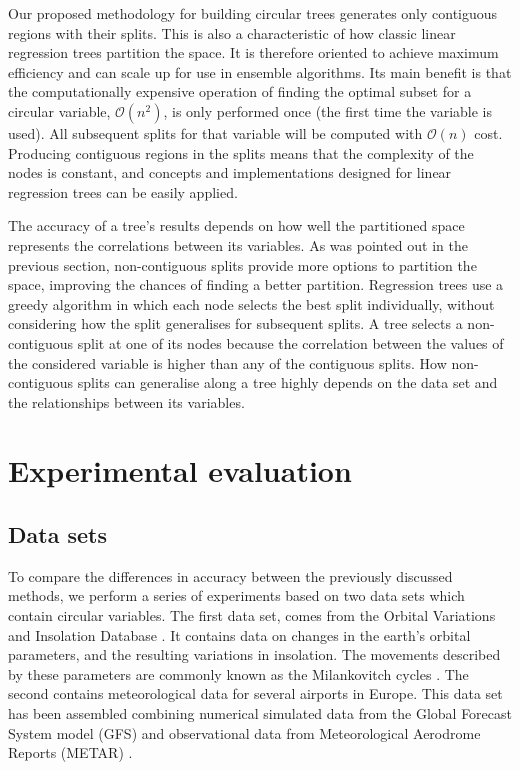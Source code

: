 \documentclass[times,twocolumn,final,authoryear]{elsarticle}
\begin{document}
Our proposed methodology for building circular trees generates only contiguous regions with their splits. This is also a characteristic of how classic linear regression trees partition the space. It is therefore oriented to achieve maximum efficiency and can scale up for use in ensemble algorithms. Its main benefit is that the computationally expensive operation of finding the optimal subset for a circular variable, $\mathcal{O}(n^2)$, is only performed once (the first time the variable is used). All subsequent splits for that variable will be computed with $\mathcal{O}(n)$ cost. Producing contiguous regions in the splits means that the complexity of the nodes is constant, and concepts and implementations designed for linear regression trees can be easily applied.

The accuracy of a tree's results depends on how well the partitioned space represents the correlations between its variables. As was pointed out in the previous section, non-contiguous splits provide more options to partition the space, improving the chances of finding a better partition. Regression trees use a greedy algorithm in which each node selects the best split individually, without considering how the split generalises for subsequent splits. A tree selects a non-contiguous split at one of its nodes because the correlation between the values of the considered variable is higher than any of the contiguous splits. How non-contiguous splits can generalise along a tree highly depends on the data set and the relationships between its variables.


\section{Experimental evaluation}

\subsection{Data sets}

To compare the differences in accuracy between the previously discussed methods, we perform a series of experiments based on two data sets which contain circular variables. The first data set, comes from the Orbital Variations and Insolation Database \citep{Berger1991}. It contains data on changes in the earth's orbital parameters, and the resulting variations in insolation. The movements described by these parameters are commonly known as the Milankovitch cycles \citep{Hays1976}. The second contains meteorological data for several airports in Europe. This data set has been assembled combining numerical simulated data from the Global Forecast System model (GFS) \citep{CampanaCaplan2005} and observational data from Meteorological Aerodrome Reports (METAR) \citep{WMO1995}.
\end{document}
